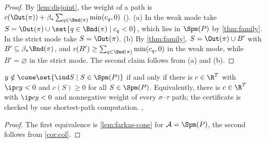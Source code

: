 \begin{proof}
By \cref{lem:disjoint}, the weight of a path is $c(\Out(\pi))+\beta_\star\sum_{q\in\Bnd(\pi)}\min(c_q,0)$ (). (a) In the weak mode take $S=\Out(\pi)\cup\set{q\in\Bnd(\pi)\mid c_q<0}$, which lies in $\Spm(P)$ by \cref{thm:family}. In the strict mode take $S=\Out(\pi)$. (b) By \cref{thm:family}, $S=\Out(\pi)\cup B'$ with $B'\subseteq\beta_\star\Bnd(\pi)$, and $c(B')\ge\sum_{q\in\Bnd(\pi)}\min(c_q,0)$ in the weak mode, while $B'=\varnothing$ in the strict mode. The second claim follows from (a) and (b).
\end{proof}

\begin{corollary}\label{cor:farkas}
$y\notin\cone\set{\ind S\mid S\in\Spm(P)}$ if and only if there is $c\in\R^T$ with $\ip cy<0$ and $c(S)\ge0$ for all $S\in\Spm(P)$. Equivalently, there is $c\in\R^T$ with $\ip cy<0$ and nonnegative weight of every $\sigma$--$\tau$ path; the certificate is checked by one shortest-path computation. \hfill{}, 
\end{corollary}

\begin{proof}
The first equivalence is \cref{lem:farkas-cone} for $\mathcal A=\Spm(P)$, the second follows from \cref{cor:col}.
\end{proof}
